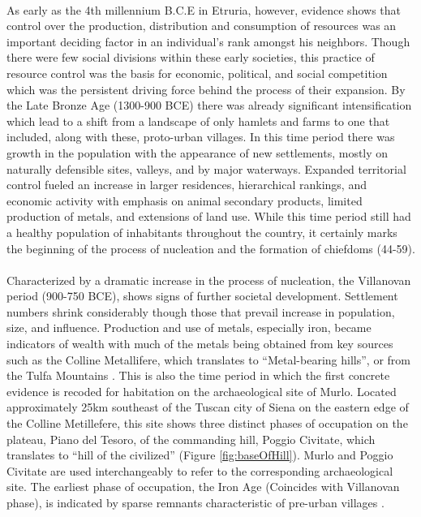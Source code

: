\documentclass[12pt,a4paper]{thesis}
\begin{document}
\paragraph{}
As early as the 4th millennium B.C.E in Etruria, however, evidence shows that control over the production, distribution and consumption of resources was an important deciding factor in an individual's rank amongst his neighbors. Though there were few social divisions within these early societies, this practice of resource control was the basis for economic, political, and social competition which was the persistent driving force behind the process of their expansion. By the Late Bronze Age (1300-900 BCE) there was already significant intensification which lead to a shift from a landscape of only hamlets and farms to one that included, along with these, proto-urban villages. In this time period there was growth in the population with the appearance of new settlements, mostly on naturally defensible sites, valleys, and by major waterways. Expanded  territorial control fueled an increase in larger residences, hierarchical rankings, and economic activity with emphasis on animal secondary products, limited production of metals, and extensions of land use. While this time period still had a healthy population of inhabitants throughout the country, it certainly marks the beginning of the process of nucleation and the formation of chiefdoms (44-59).

\paragraph{}  
Characterized by a dramatic increase in the process of nucleation, the Villanovan period (900-750 BCE), shows signs of further societal development.  Settlement numbers shrink considerably though those that prevail increase in population, size, and influence. Production and use of metals, especially iron, became indicators of wealth with much of the metals being obtained from key sources such as the Colline Metallifere, which translates to ``Metal-bearing hills'', or from the Tulfa Mountains \cite[75-77]{SpiSto92}. This is also the time period in which the first concrete evidence is recoded for habitation on the archaeological site of Murlo. Located approximately 25km southeast of the Tuscan city of Siena on the eastern edge of the Colline Metillefere, this site shows three distinct phases of occupation on the plateau, Piano del Tesoro, of the commanding hill, Poggio Civitate, which translates to ``hill of the civilized'' (Figure \ref{fig:baseOfHill}). Murlo and Poggio Civitate are used interchangeably to refer to the corresponding archaeological site. The earliest phase of occupation, the Iron Age (Coincides with Villanovan phase), is indicated by sparse remnants characteristic of pre-urban villages \citep{AnnAnd}.
\end{document}
